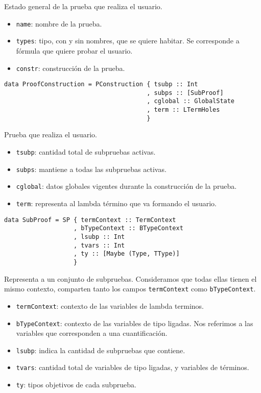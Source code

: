 \documentclass[a4paper,11pt]{article}
\theoremstyle{definition}
\begin{document}
Estado general de la prueba que realiza el usuario.
\begin{itemize}
  \item \texttt{name}: nombre de la prueba.
  \item \texttt{types}: tipo, con y sin nombres, que se quiere habitar. Se corresponde a fórmula que quiere probar el usuario.
  \item \texttt{constr}: construcción de la prueba.
\end{itemize}

\begin{verbatim}
data ProofConstruction = PConstruction { tsubp :: Int
                                       , subps :: [SubProof]
                                       , cglobal :: GlobalState
                                       , term :: LTermHoles
                                       }
\end{verbatim}

Prueba que realiza el usuario.
\begin{itemize}
  \item \texttt{tsubp}: cantidad total de subpruebas activas.
  \item \texttt{subps}: mantiene a todas las subpruebas activas.
  \item \texttt{cglobal}: datos globales vigentes durante la construcción de la prueba.
  \item \texttt{term}: representa al lambda término que va formando el usuario.
\end{itemize}

\begin{verbatim}
data SubProof = SP { termContext :: TermContext
                   , bTypeContext :: BTypeContext
                   , lsubp :: Int
                   , tvars :: Int
                   , ty :: [Maybe (Type, TType)]
                   }
\end{verbatim}

Representa a un conjunto de subpruebas.
Consideramos que todas ellas tienen el mismo contexto, comparten tanto los campos \texttt{termContext} como \texttt{bTypeContext}.
\begin{itemize}
  \item \texttt{termContext}: contexto de las variables de lambda terminos.
  \item \texttt{bTypeContext}: contexto de las variables de tipo ligadas. Nos referimos a las variables que corresponden a una cuantificación.
  \item \texttt{lsubp}: indica la cantidad de subpruebas que contiene.
  \item \texttt{tvars}: cantidad total de variables de tipo ligadas, y variables de términos.
  \item \texttt{ty}: tipos objetivos de cada subprueba.
\end{itemize}
\end{document}
